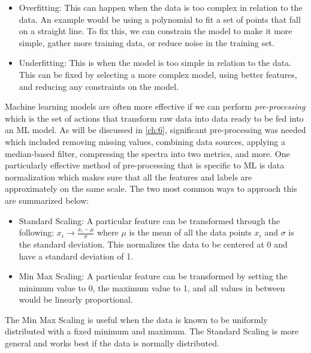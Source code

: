 \begin{itemize}
	\item Overfitting: This can happen when the data is too complex in relation to the data. An example would be using a polynomial to fit a set of points that fall on a straight line. To fix this, we can constrain the model to make it more simple, gather more training data, or reduce noise in the training set.
	\item Underfitting: This is when the model is too simple in relation to the data. This can be fixed by selecting a more complex model, using better features, and reducing any constraints on the model.
\end{itemize} 
Machine learning models are often more effective if we can perform \emph{pre-processing} which is the set of actions that transform raw data into data ready to be fed into an \gls{ML} model. As will be discussed in \autoref{ch:6}, significant pre-processing was needed which included removing missing values, combining data sources, applying a median-based filter, compressing the spectra into two metrics, and more. One particularly effective method of pre-processing that is specific to \gls{ML} is data normalization which makes sure that all the features and labels are approximately on the same scale. The two most common ways to approach this are summarized below: 

\begin{itemize}
	\item Standard Scaling: A particular feature can be transformed through the following: $x_i \rightarrow \frac{x_i - \mu}{\sigma}$ where $\mu$ is the mean of all the data points $x_i$ and $\sigma$ is the standard deviation. This normalizes the data to be centered at 0 and have a standard deviation of 1. 
	\item Min Max Scaling: A particular feature can be transformed by setting the minimum value to 0, the maximum value to 1, and all values in between would be linearly proportional. 
\end{itemize}
The Min Max Scaling is useful when the data is known to be uniformly distributed with a fixed minimum and maximum. The Standard Scaling is more general and works best if the data is normally distributed. 

